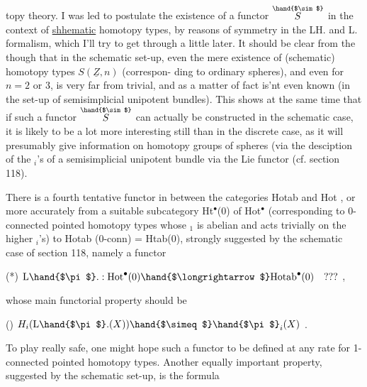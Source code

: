 
topy theory.   I was led to postulate the existence of a functor $\overset{\hand{$\sim$}}{S}$  in
the context of \uline{shhematic} homotopy types,  by reasons of symmetry in the
LH.  and L\hand{$\pi$}. formalism,  which I'll try to get through a little later.
It should be clear from the  though that in the schematic set-up,
even the mere existence of (schematic) homotopy types $S(\underline{Z},n)$  (correspon-%
ding to ordinary spheres),  and  even for $n=2$ or $3$, is very far from
trivial,  and as a matter of fact is'nt even known (in the set-up of
semisimplicial unipotent bundles).  This shows at the same time that if
such a functor $\overset{\hand{$\sim$}}{S}$ can actually be constructed in the schematic case,  it is
likely to be a lot more interesting still than in the discrete case,  as
it will presumably give information on homotopy groups of spheres (via the
desciption of the \hand{$\pi$}$_i$'s  of a semisimplicial unipotent bundle via the Lie
functor  (cf. section 118)\hand{)}.

\margin{\unsure{+}}There  is a fourth tentative functor in between the categories
Hotab  and  Hot ,  or more accurately\unsure{;}  from a suitable subcategory
Ht$^\bullet$(0)  of Hot$^\bullet$  (corresponding to 0-connected pointed homotopy types
whose \hand{$\pi$}$_1$ is abelian and acts trivially on the higher \hand{$\pi$}$_i$'s) to
Hotab (0-conn) = Htab(0),  strongly suggested by the schematic case of
section 118,  namely a functor

(*) \qquad $\mathrm{L}\hand{$\pi$}. : \mathrm{Hot}^\bullet(0) \hand{$\longrightarrow$} \mathrm{Hotab}^\bullet(0) \quad ???$  ,

whose main functorial property should be

() \qquad $H_i(\mathrm{L}\hand{$\pi$}.(X)) \hand{$\simeq$} \hand{$\pi$}_i(X)$ \quad {} .

To play really safe,  one might hope such a functor to be defined at any
rate for 1-connected pointed homotopy types.  Another equally important
property, suggested by the schematic set-up, is the formula

